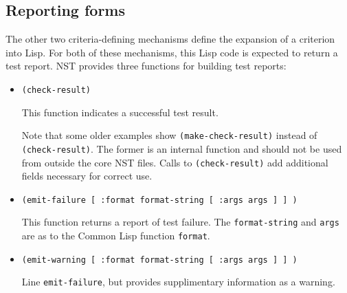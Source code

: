 \subsection{Reporting forms}
\label{sec:criteria-forms-report}
The other two criteria-defining mechanisms define the expansion of a
criterion into Lisp.  For both of these mechanisms, this Lisp code is
expected to return a test report.  NST provides three functions for
building test reports:
\begin{itemize}
\item\texttt{(check-result)}\par This function indicates a successful
  test result.

  Note that some older examples show \texttt{(make-check-result)}
  instead of \texttt{(check-result)}.  The former is an internal
  function and should not be used from outside the core NST files.
  Calls to \texttt{(check-result)} add additional fields necessary for
  correct use.
\item\texttt{(emit-failure [ :format format-string [ :args args ] ] )}
  \par This function returns a report of test failure.  The
  \texttt{format-string} and \texttt{args} are as to the Common Lisp
  function \texttt{format}.
\item\texttt{(emit-warning [ :format format-string [ :args args ] ] )}
  \par Line \texttt{emit-failure}, but provides supplimentary
  information as a warning.
\end{itemize}

